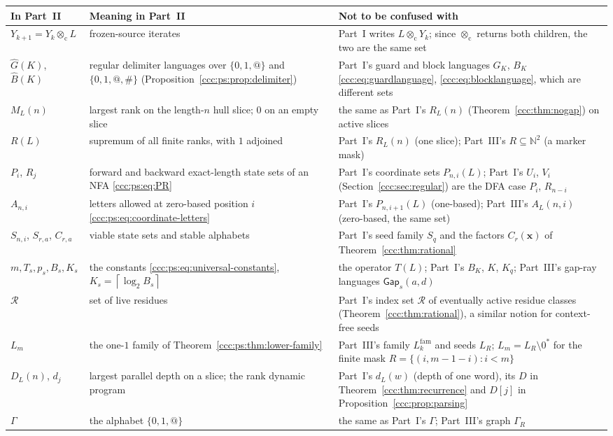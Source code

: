 \documentclass[11pt,letterpaper]{article}
\theoremstyle{definition}
\theoremstyle{remark}
\newcommand{\N}{\mathbb N}
\newcommand{\cut}{\otimes_{\mathrm c}}
\newcommand{\clog}[1]{\left\lceil\log_2 #1\right\rceil}
\newcommand{\res}{\mathcal R}
\begin{document}
\begin{center}\small
\begin{tabular}{@{}>{\raggedright\arraybackslash}p{}>{\raggedright\arraybackslash}p{}>{\raggedright\arraybackslash}p{}@{}}
\toprule
\textbf{In Part~II} & \textbf{Meaning in Part~II} & \textbf{Not to be confused with}\\
\midrule
$Y_{k+1}=Y_k\cut L$ & frozen-source iterates & Part~I writes $L\cut Y_k$; since $\cut$ returns both children, the two are the same set\\[3pt]
$\widehat G(K)$, $\widehat B(K)$ & regular delimiter languages over $\{0,1,@\}$ and $\{0,1,@,\#\}$ (Proposition~\ref{ccc:ps:prop:delimiter}) & Part~I's guard and block languages $G_K$, $B_K$ \eqref{ccc:eq:guardlanguage}, \eqref{ccc:eq:blocklanguage}, which are different sets\\[3pt]
$M_L(n)$ & largest rank on the length-$n$ hull slice; $0$ on an empty slice & the same as Part~I's $R_L(n)$ (Theorem~\ref{ccc:thm:nogap}) on active slices\\[3pt]
$R(L)$ & supremum of all finite ranks, with $1$ adjoined & Part~I's $R_L(n)$ (one slice); Part~III's $R\subseteq\N^2$ (a marker mask)\\[3pt]
$P_i$, $R_j$ & forward and backward exact-length state sets of an NFA \eqref{ccc:ps:eq:PR} & Part~I's coordinate sets $P_{n,i}(L)$; Part~I's $U_i$, $V_i$ (Section~\ref{ccc:sec:regular}) are the DFA case $P_i$, $R_{n-i}$\\[3pt]
$A_{n,i}$ & letters allowed at zero-based position $i$ \eqref{ccc:ps:eq:coordinate-letters} & Part~I's $P_{n,i+1}(L)$ (one-based); Part~III's $A_L(n,i)$ (zero-based, the same set)\\[3pt]
$S_{n,i}$, $S_{r,a}$, $C_{r,a}$ & viable state sets and stable alphabets & Part~I's seed family $S_q$ and the factors $C_r(\mathbf x)$ of Theorem~\ref{ccc:thm:rational}\\[3pt]
$m,T_s,p_s,B_s,K_s$ & the constants \eqref{ccc:ps:eq:universal-constants}, $K_s=\clog{B_s}$ & the operator $T(L)$; Part~I's $B_K$, $K$, $K_q$; Part~III's gap-ray languages $\mathsf{Gap}_s(a,d)$\\[3pt]
$\res$ & set of live residues & Part~I's index set $\mathcal R$ of eventually active residue classes (Theorem~\ref{ccc:thm:rational}), a similar notion for context-free seeds\\[3pt]
$L_m$ & the one-$1$ family of Theorem~\ref{ccc:ps:thm:lower-family} & Part~III's family $L^{\mathrm{fam}}_k$ and seeds $L_R$; $L_m=L_R\setminus0^*$ for the finite mask $R=\{(i,m-1-i):i<m\}$\\[3pt]
$D_L(n)$, $d_j$ & largest parallel depth on a slice; the rank dynamic program & Part~I's $d_L(w)$ (depth of one word), its $D$ in Theorem~\ref{ccc:thm:recurrence} and $D[j]$ in Proposition~\ref{ccc:prop:parsing}\\[3pt]
$\Gamma$ & the alphabet $\{0,1,@\}$ & the same as Part~I's $\Gamma$; Part~III's graph $\Gamma_R$\\
\bottomrule
\end{tabular}
\end{center}
\end{document}
